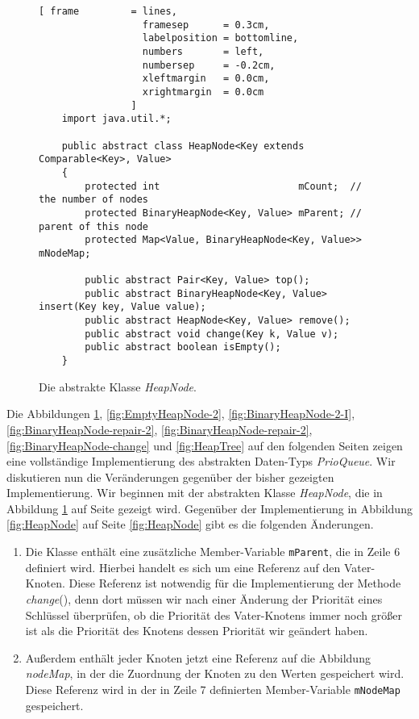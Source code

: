 \begin{figure}[!h]
  \centering
\begin{Verbatim}[ frame         = lines, 
                  framesep      = 0.3cm, 
                  labelposition = bottomline,
                  numbers       = left,
                  numbersep     = -0.2cm,
                  xleftmargin   = 0.0cm,
                  xrightmargin  = 0.0cm
                ]
    import java.util.*;
    
    public abstract class HeapNode<Key extends Comparable<Key>, Value>
    {
        protected int                        mCount;  // the number of nodes
        protected BinaryHeapNode<Key, Value> mParent; // parent of this node
        protected Map<Value, BinaryHeapNode<Key, Value>> mNodeMap;
    
        public abstract Pair<Key, Value> top();    
        public abstract BinaryHeapNode<Key, Value> insert(Key key, Value value);
        public abstract HeapNode<Key, Value> remove();
        public abstract void change(Key k, Value v);
        public abstract boolean isEmpty();
    }
\end{Verbatim}
\vspace*{-0.3cm}
  \caption{Die abstrakte Klasse \textsl{HeapNode}.}
  \label{fig:HeapNode-2}
\end{figure}

Die Abbildungen \ref{fig:HeapNode-2},  \ref{fig:EmptyHeapNode-2},
\ref{fig:BinaryHeapNode-2-I},  \ref{fig:BinaryHeapNode-repair-2},
\ref{fig:BinaryHeapNode-repair-2}, \ref{fig:BinaryHeapNode-change} und \ref{fig:HeapTree} 
auf den folgenden Seiten zeigen eine vollst\"andige
Implementierung des abstrakten Daten-Typs \textsl{PrioQueue}.  Wir diskutieren nun die
Ver\"anderungen gegen\"uber der bisher gezeigten Implementierung.  
Wir beginnen mit der abstrakten Klasse \textsl{HeapNode}, die in Abbildung
\ref{fig:HeapNode-2} auf Seite \pageref{fig:HeapNode-2} gezeigt wird.
Gegen\"uber der Implementierung in Abbildung \ref{fig:HeapNode} auf Seite \ref{fig:HeapNode}
gibt es die folgenden \"Anderungen.
\begin{enumerate}
\item Die Klasse enth\"alt eine zus\"atzliche Member-Variable \texttt{mParent}, die in Zeile 6
      definiert wird.  Hierbei handelt es sich um eine Referenz auf den Vater-Knoten.
      Diese Referenz ist notwendig f\"ur die Implementierung der Methode \textsl{change}(),
      denn dort m\"ussen wir nach einer \"Anderung der Priorit\"at eines Schl\"ussel \"uberpr\"ufen, 
      ob die Priorit\"at des Vater-Knotens immer noch gr\"o{\ss}er ist als die Priorit\"at des Knotens dessen
      Priorit\"at wir ge\"andert haben.
\item Au{\ss}erdem enth\"alt jeder Knoten jetzt eine Referenz auf die Abbildung
      \textsl{nodeMap}, in der die Zuordnung der Knoten zu den Werten gespeichert wird.
      Diese Referenz wird in der in Zeile 7 definierten Member-Variable \texttt{mNodeMap}
      gespeichert.
\end{enumerate}

